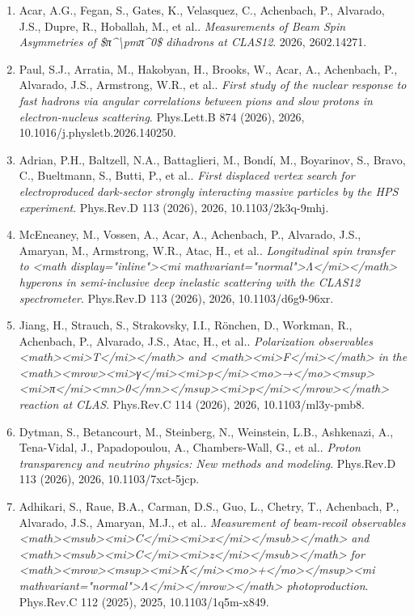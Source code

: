 \begin{enumerate}
\item Acar, A.G., Fegan, S., Gates, K., Velasquez, C., Achenbach, P., Alvarado, J.S., Dupre, R., Hoballah, M., et al.. \textit{Measurements of Beam Spin Asymmetries of \$π\textasciicircum{}\textbackslash{}pmπ\textasciicircum{}0\$ dihadrons at CLAS12}. 2026, 2602.14271.
\item Paul, S.J., Arratia, M., Hakobyan, H., Brooks, W., Acar, A., Achenbach, P., Alvarado, J.S., Armstrong, W.R., et al.. \textit{First study of the nuclear response to fast hadrons via angular correlations between pions and slow protons in electron-nucleus scattering}. Phys.Lett.B 874 (2026), 2026, 10.1016/j.physletb.2026.140250.
\item Adrian, P.H., Baltzell, N.A., Battaglieri, M., Bondí, M., Boyarinov, S., Bravo, C., Bueltmann, S., Butti, P., et al.. \textit{First displaced vertex search for electroproduced dark-sector strongly interacting massive particles by the HPS experiment}. Phys.Rev.D 113 (2026), 2026, 10.1103/2k3q-9mhj.
\item McEneaney, M., Vossen, A., Acar, A., Achenbach, P., Alvarado, J.S., Amaryan, M., Armstrong, W.R., Atac, H., et al.. \textit{Longitudinal spin transfer to <math display="inline"><mi mathvariant="normal">Λ</mi></math> hyperons in semi-inclusive deep inelastic scattering with the CLAS12 spectrometer}. Phys.Rev.D 113 (2026), 2026, 10.1103/d6g9-96xr.
\item Jiang, H., Strauch, S., Strakovsky, I.I., Rönchen, D., Workman, R., Achenbach, P., Alvarado, J.S., Atac, H., et al.. \textit{Polarization observables <math><mi>T</mi></math> and <math><mi>F</mi></math> in the <math><mrow><mi>γ</mi><mi>p</mi><mo>→</mo><msup><mi>π</mi><mn>0</mn></msup><mi>p</mi></mrow></math> reaction at CLAS}. Phys.Rev.C 114 (2026), 2026, 10.1103/ml3y-pmb8.
\item Dytman, S., Betancourt, M., Steinberg, N., Weinstein, L.B., Ashkenazi, A., Tena-Vidal, J., Papadopoulou, A., Chambers-Wall, G., et al.. \textit{Proton transparency and neutrino physics: New methods and modeling}. Phys.Rev.D 113 (2026), 2026, 10.1103/7xct-5jcp.
\item Adhikari, S., Raue, B.A., Carman, D.S., Guo, L., Chetry, T., Achenbach, P., Alvarado, J.S., Amaryan, M.J., et al.. \textit{Measurement of beam-recoil observables <math><msub><mi>C</mi><mi>x</mi></msub></math> and <math><msub><mi>C</mi><mi>z</mi></msub></math> for <math><mrow><msup><mi>K</mi><mo>+</mo></msup><mi mathvariant="normal">Λ</mi></mrow></math> photoproduction}. Phys.Rev.C 112 (2025), 2025, 10.1103/1q5m-x849.

\end{enumerate}
